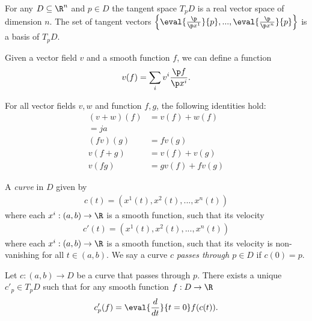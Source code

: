 \documentclass{article}
\begin{document}
\begin{theorem}[Notes 4.4]
    For any $D\subseteq \R^n$ and $p\in D$ the tangent space $T_pD$ is a real vector space
    of dimension $n$. The set of tangent vectors 
    $\left\lbrace\eval{\frac{\p }{\p x^1}}{p}, ...,\eval{\frac{\p }{\p x^n}}{p}\right\rbrace$
    is a basis of $T_pD$.
\end{theorem}

\begin{definition}
    Given a vector field $v$ and a smooth function $f$, we can define a function 
    \begin{align*}
        v(f) = \sum_i v^i\frac{\p f}{\p x^i}.
    \end{align*}
\end{definition}

\begin{proposition}
    For all vector fields $v,w$ and function $f,g$, the following identities hold:
    \begin{align*}
        (v+w)(f) &= v(f) + w(f)\\=ja\\
        (fv)(g)  &= fv(g) \\
        v(f+g)   &= v(f) + v(g) \\
        v(fg)    &= gv(f) + fv(g)
    \end{align*}
\end{proposition}

\begin{definition}
    A \emph{curve} in $D$ given by
    \begin{align*}
        c(t) = (x^1(t), x^2(t), ..., x^n(t))
    \end{align*}
    where each $x^i:(a,b)\to\R$ is a smooth function, such that its velocity
    \begin{align*}
        c'(t)=(x^1(t), x^2(t), ..., x^n(t))
    \end{align*}
    where each $x^i:(a,b)\to\R$ is a smooth function, such that its velocity
    is non-vanishing for all $t\in(a,b)$. 
    We say a curve $c$ \emph{passes through $p\in D$} if $c(0)=p$.
\end{definition}

\begin{proposition}
    Let $c:(a,b)\to D$ be a curve that passes through $p$. There exists a unique
    $c'_p\in T_p D$ such that for any smooth function $f:D\to\R$
    \begin{align*}
        c'_p(f) = \eval{\frac{d}{dt}}{t=0} f(c(t)).
    \end{align*}
\end{proposition}
\end{document}
